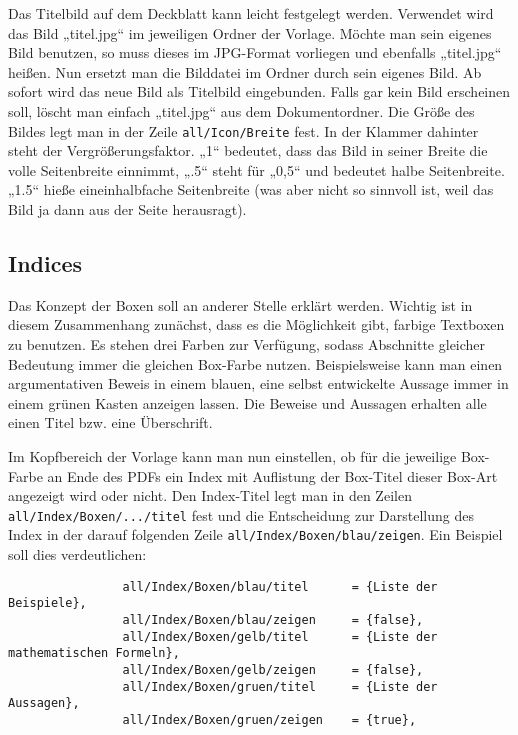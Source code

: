 				Das Titelbild auf dem Deckblatt kann leicht festgelegt werden. Verwendet wird das Bild „titel.jpg“ im jeweiligen Ordner der Vorlage. Möchte man sein eigenes Bild benutzen, so muss dieses im JPG-Format vorliegen und ebenfalls „titel.jpg“ heißen. Nun ersetzt man die Bilddatei im Ordner durch sein eigenes Bild. Ab sofort wird das neue Bild als Titelbild eingebunden. Falls gar kein Bild erscheinen soll, löscht man einfach „titel.jpg“ aus dem Dokumentordner. Die Größe des Bildes legt man in der Zeile \texttt{all/Icon/Breite} fest. In der Klammer dahinter steht der Vergrößerungsfaktor. „1“ bedeutet, dass das Bild in seiner Breite die volle Seitenbreite einnimmt, „.5“ steht für „0,5“ und bedeutet halbe Seitenbreite. „1.5“ hieße eineinhalbfache Seitenbreite (was aber nicht so sinnvoll ist, weil das Bild ja dann aus der Seite herausragt).

			\subsection{Indices}

				Das Konzept der Boxen soll an anderer Stelle erklärt werden. Wichtig ist in diesem Zusammenhang zunächst, dass es die Möglichkeit gibt, farbige Textboxen zu benutzen. Es stehen drei Farben zur Verfügung, sodass Abschnitte gleicher Bedeutung immer die gleichen Box-Farbe nutzen. Beispielsweise kann man einen argumentativen Beweis in einem blauen, eine selbst entwickelte Aussage immer in einem grünen Kasten anzeigen lassen. Die Beweise und Aussagen erhalten alle einen Titel bzw. eine Überschrift.

				Im Kopfbereich der Vorlage kann man nun einstellen, ob für die jeweilige Box-Farbe an Ende des PDFs ein Index mit Auflistung der Box-Titel dieser Box-Art angezeigt wird oder nicht. Den Index-Titel legt man in den Zeilen\\ \texttt{all/Index/Boxen/.../titel} fest und die Entscheidung zur Darstellung des Index in der darauf folgenden Zeile \texttt{all/Index/Boxen/blau/zeigen}. Ein Beispiel soll dies verdeutlichen:

				\newpage

				\begin{verbatim}
				all/Index/Boxen/blau/titel      = {Liste der Beispiele},
				all/Index/Boxen/blau/zeigen     = {false},
				all/Index/Boxen/gelb/titel      = {Liste der mathematischen Formeln},
				all/Index/Boxen/gelb/zeigen     = {false},
				all/Index/Boxen/gruen/titel     = {Liste der Aussagen},
				all/Index/Boxen/gruen/zeigen    = {true},
				\end{verbatim}

